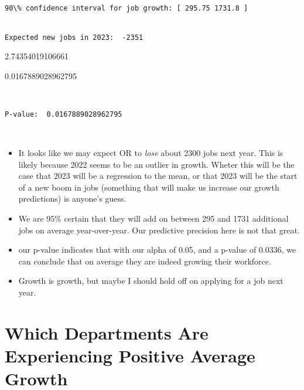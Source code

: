 \documentclass[11pt]{article}
\begin{document}
    
    \begin{Verbatim}[commandchars=\\\{\}]

90\% confidence interval for job growth: [ 295.75 1731.8 ]


Expected new jobs in 2023:  -2351
    \end{Verbatim}

    2.74354019106661

    
    0.0167889028962795

    
    \begin{Verbatim}[commandchars=\\\{\}]


P-value:  0.0167889028962795
    \end{Verbatim}

    \begin{center}
    \end{center}
    { \hspace*{\fill} \\}
    
    \begin{itemize}
\item
  It looks like we may expect OR to \emph{lose} about 2300 jobs next
  year. This is likely because 2022 seems to be an outlier in growth.
  Wheter this will be the case that 2023 will be a regression to the
  mean, or that 2023 will be the start of a new boom in jobs (something
  that will make us increase our growth predictions) is anyone's guess.
\item
  We are 95\% certain that they will add on between 295 and 1731
  additional jobs on average year-over-year. Our predictive precision
  here is not that great.
\item
  our p-value indicates that with our alpha of 0.05, and a p-value of
  0.0336, we can conclude that on average they are indeed growing their
  workforce.
\item
  Growth is growth, but maybe I should hold off on applying for a job
  next year.
\end{itemize}

    \hypertarget{which-departments-are-experiencing-positive-average-growth}{%
\section{Which Departments Are Experiencing Positive Average
Growth}\label{which-departments-are-experiencing-positive-average-growth}}
\end{document}
